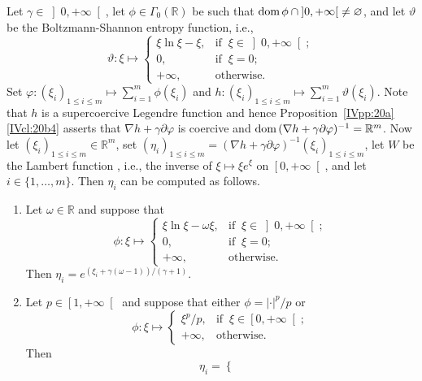 \documentclass[a4paper,11pt,fleqn]{article}
\renewcommand{\leq}{\ensuremath{\leqslant}}
\newcommand{\emp}{\ensuremath{{\varnothing}}}
\newcommand{\RR}{\ensuremath{\mathbb{R}}}
\newcommand{\RP}{\ensuremath{\left[0,+\infty\right[}}
\newcommand{\RPP}{\ensuremath{\left]0,+\infty\right[}}
\newcommand{\pinf}{\ensuremath{{+\infty}}}
\newcommand{\dom}{\ensuremath{\text{\rm dom}\,}}
\theoremstyle{plain}{\theorembodyfont{\rmfamily}%
\newtheorem{conjecture}[theorem]{Conjecture}}
\theoremstyle{plain}{\theorembodyfont{\rmfamily}%
\newtheorem{example}[theorem]{Example}}
\theoremstyle{plain}{\theorembodyfont{\rmfamily}%
\newtheorem{remark}[theorem]{Remark}}
\theoremstyle{plain}{\theorembodyfont{\rmfamily}%
\newtheorem{algorithm}[theorem]{Algorithm}}
\theoremstyle{plain}{\theorembodyfont{\rmfamily}%
\newtheorem{condition}[theorem]{Condition}}
\theoremstyle{plain}{\theorembodyfont{\rmfamily}%
\newtheorem{definition}[theorem]{Definition}}
\theoremstyle{plain}{\theorembodyfont{\rmfamily}
\newtheorem{problem}[theorem]{Problem}}
\theoremstyle{plain}{\theorembodyfont{\rmfamily}
\newtheorem{notation}[theorem]{Notation}}
\numberwithin{equation}{section}
\begin{document}
\begin{example}
\label{IVex:1}
Let $\gamma\in\RPP$, let $\phi\in\Gamma_0(\RR)$ be such that 
$\dom\phi\cap\RPP\neq\emp$, and let $\vartheta$ be the 
Boltzmann-Shannon entropy function, i.e.,
\begin{equation}
\vartheta\colon\xi\mapsto
\begin{cases}
\xi\ln\xi-\xi,&\text{if}\;\;\xi\in\RPP;\\
0,&\text{if}\;\;\xi=0;\\
\pinf,&\text{otherwise}.
\end{cases}
\end{equation}
Set $\varphi\colon(\xi_i)_{1\leq i\leq m}\mapsto
\sum_{i=1}^m\phi(\xi_i)$ and $h\colon(\xi_i)_{1\leq i\leq m}
\mapsto\sum_{i=1}^m\vartheta(\xi_i)$. Note that $h$ is a 
supercoercive Legendre function \cite[Sections~5 and 6]{BB97} 
and hence Proposition~\ref{IVpp:20a}\ref{IVcl:20b4} asserts 
that $\nabla h+\gamma\partial\varphi$ is coercive and 
$\dom(\nabla h+\gamma\partial\varphi)^{-1}=\RR^m$. 
Now let $(\xi_i)_{1\leq i\leq m}\in\RR^m$, set 
$(\eta_i)_{1\leq i\leq m}
=(\nabla h+\gamma\partial\varphi)^{-1}(\xi_i)_{1\leq i\leq m}$, 
let $W$ be the Lambert function \cite{IVlamb96,Lamb58}, 
i.e., the inverse of $\xi\mapsto\xi e^{\xi}$ on $\RP$, 
and let $i\in\{1,\ldots,m\}$. Then $\eta_i$ can be computed 
as follows.
\begin{enumerate}
\item
\label{IVex:1ii}
Let $\omega\in\RR$ and suppose that 
\begin{equation}
\phi\colon\xi\mapsto
\begin{cases}
\xi\ln\xi-\omega\xi,&\text{if}\;\;\xi\in\RPP;\\
0,&\text{if}\;\;\xi=0;\\
+\infty,&\text{otherwise}.
\end{cases}
\end{equation}
Then $\eta_i=e^{(\xi_i+\gamma(\omega-1))/(\gamma+1)}$.
\item 
\label{IVex:1iii}
Let $p\in\left[1,+\infty\right[$ 
and suppose that either $\phi=|\cdot|^p/p$ or
\begin{equation}
\phi\colon\xi\mapsto
\begin{cases}
\xi^p/p,&\text{if}\;\;\xi\in\RP;\\
+\infty,&\text{otherwise}.
\end{cases}
\end{equation}
Then 
\begin{equation}
\eta_i=
\begin{cases}

\end{cases}
\end{equation}
\end{enumerate}
\end{example}
\end{document}
